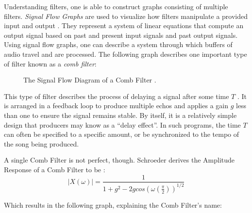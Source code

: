 Understanding filters, one is able to construct graphs consisting of multiple filters. \textit{Signal Flow Graphs} are used to visualize how filters manipulate a provided input and output \cite{FILTERS07}. They represent a system of linear equations that compute an output signal based on past and present input signals and past output signals. Using signal flow graphs, one can describe a system through which buffers of audio travel and are processed. The following graph describes one important type of filter known as a \textit{comb filter}:

\begin{figure}[h] %
	\begin{center}
		\caption{The Signal Flow Diagram of a Comb Filter \cite{schroeder1961colorless}.}
	\end{center}
\end{figure}

This type of filter describes the process of delaying a signal after some time $T$ \cite{schroeder1961colorless}. It is arranged in a feedback loop to produce multiple echos and applies a gain $g$ less than one to ensure the signal remains stable. By itself, it is a relatively simple design that producers may know as a ``delay effect''. In such programs, the time $T$ can often be specified to a specific amount, or be synchronized to the tempo of the song being produced.

A single Comb Filter is not perfect, though. Schroeder derives the Amplitude Response of a Comb Filter to be \cite{schroeder1961natural}:
\begin{equation}\label{comb}
	|X(\omega)|=\frac{1}{1+g^2-2g cos(\omega(\frac{\pi}{2}))^{1/2}}
\end{equation}

Which results in the following graph, explaining the Comb Filter's name:
\pagebreak

